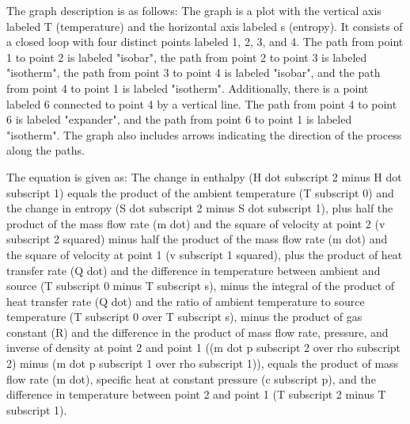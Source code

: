 The graph description is as follows: The graph is a plot with the vertical axis labeled T (temperature) and the horizontal axis labeled s (entropy). It consists of a closed loop with four distinct points labeled 1, 2, 3, and 4. The path from point 1 to point 2 is labeled "isobar", the path from point 2 to point 3 is labeled "isotherm", the path from point 3 to point 4 is labeled "isobar", and the path from point 4 to point 1 is labeled "isotherm". Additionally, there is a point labeled 6 connected to point 4 by a vertical line. The path from point 4 to point 6 is labeled "expander", and the path from point 6 to point 1 is labeled "isotherm". The graph also includes arrows indicating the direction of the process along the paths.

The equation is given as:
The change in enthalpy (H dot subscript 2 minus H dot subscript 1) equals the product of the ambient temperature (T subscript 0) and the change in entropy (S dot subscript 2 minus S dot subscript 1), plus half the product of the mass flow rate (m dot) and the square of velocity at point 2 (v subscript 2 squared) minus half the product of the mass flow rate (m dot) and the square of velocity at point 1 (v subscript 1 squared), plus the product of heat transfer rate (Q dot) and the difference in temperature between ambient and source (T subscript 0 minus T subscript s), minus the integral of the product of heat transfer rate (Q dot) and the ratio of ambient temperature to source temperature (T subscript 0 over T subscript s), minus the product of gas constant (R) and the difference in the product of mass flow rate, pressure, and inverse of density at point 2 and point 1 ((m dot p subscript 2 over rho subscript 2) minus (m dot p subscript 1 over rho subscript 1)), equals the product of mass flow rate (m dot), specific heat at constant pressure (c subscript p), and the difference in temperature between point 2 and point 1 (T subscript 2 minus T subscript 1).

